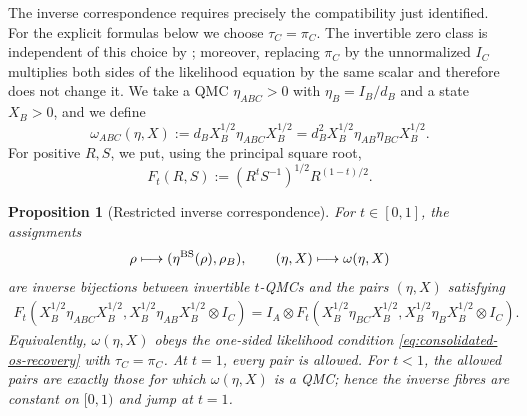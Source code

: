 \documentclass[11pt]{article}
\newtheorem{proposition}[proposition]{Proposition}
\theoremstyle{remark}
\newcommand{\1}{\mathbbm{1}}
\begin{document}
The inverse correspondence requires precisely the compatibility just
identified.
For the explicit formulas below we choose $\tau_C=\pi_C$.  The
invertible zero class is independent of this choice by
; moreover, replacing
$\pi_C$ by the unnormalized $I_C$ multiplies both sides of the
likelihood equation by the same scalar and therefore does not change
it.
We take a QMC $\eta_{ABC}>0$ with $\eta_B=I_B/d_B$ and a state
$X_B>0$, and we define
\begin{equation}
 \omega_{ABC}(\eta,X)
 :=d_BX_B^{1/2}\eta_{ABC}X_B^{1/2}
 =d_B^2X_B^{1/2}\eta_{AB}\eta_{BC}X_B^{1/2}.
 \label{eq:consolidated-inverse-BS}
\end{equation}
For positive $R,S$, we put, using the principal square root,
\begin{equation}
 F_t(R,S):=(R^tS^{-1})^{1/2}R^{(1-t)/2}.
\end{equation}

\begin{proposition}[Restricted inverse correspondence]
\label{prop:consolidated-restricted-inverse}
For $t\in[0,1]$, the assignments
\begin{equation}
 \rho\longmapsto(\eta^{\rm BS}(\rho),\rho_B),
 \qquad
 (\eta,X)\longmapsto\omega(\eta,X)
\end{equation}
are inverse bijections between invertible $t$-QMCs and the pairs
$(\eta,X)$ satisfying
\begin{multline}
 F_t\!\left(X_B^{1/2}\eta_{ABC}X_B^{1/2},
            X_B^{1/2}\eta_{AB}X_B^{1/2}\otimes I_C\right)
 =I_A\otimes
 F_t\!\left(X_B^{1/2}\eta_{BC}X_B^{1/2},
            X_B^{1/2}\eta_BX_B^{1/2}\otimes I_C\right).
 \label{eq:consolidated-restricted-constraint}
\end{multline}
Equivalently, $\omega(\eta,X)$ obeys the one-sided likelihood
condition \eqref{eq:consolidated-os-recovery} with
$\tau_C=\pi_C$.  At $t=1$, every
pair is allowed.  For $t<1$, the allowed pairs are exactly those
for which $\omega(\eta,X)$ is a QMC; hence the inverse
fibres are constant on $[0,1)$ and jump at $t=1$.
\end{proposition}
\end{document}
